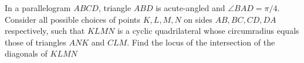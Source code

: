 In a parallelogram $ABCD$, triangle $ABD$ is acute-angled and $\angle BAD = \pi /4$. Consider all possible choices of points $K,L,M,N$ on sides $AB,BC, CD,DA$ respectively, such that $KLMN$ is a cyclic quadrilateral whose circumradius equals those of triangles $ANK$ and $CLM$. Find the locus of the intersection of the diagonals of $KLMN$